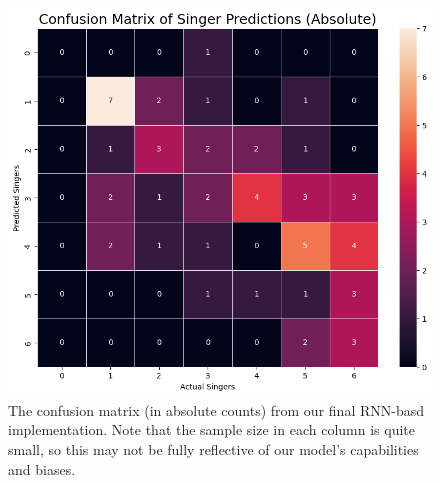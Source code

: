\documentclass[conference]{IEEEtran}
\begin{document}
\begin{figure}[ht]
    \centering
    \includegraphics[scale=0.25]{RNN2_confusion_matrix.png}
    \caption{The confusion matrix (in absolute counts) from our final RNN-basd implementation. Note that the sample size in each column is quite small, so this may not be fully reflective of our model's capabilities and biases.}
    \label{fig:rnn2_conf_mat}
\end{figure}
\end{document}
